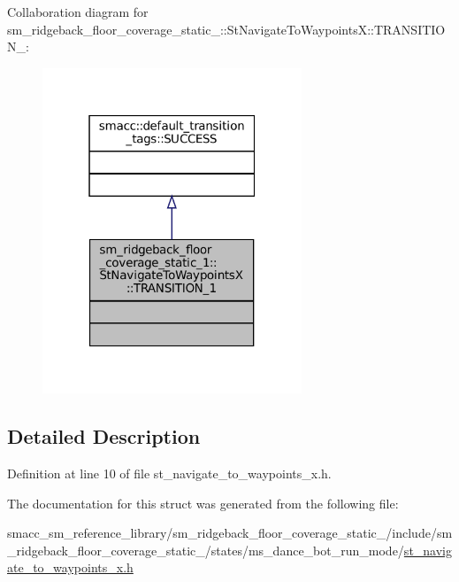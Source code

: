 Collaboration diagram for sm\+\_\+ridgeback\+\_\+floor\+\_\+coverage\+\_\+static\+\_\+:\+:St\+Navigate\+To\+WaypointsX\+:\+:T\+R\+A\+N\+S\+I\+T\+I\+O\+N\+\_\+:
\nopagebreak
\begin{figure}[H]
\begin{center}
\leavevmode
\includegraphics[width=220pt]{structsm__ridgeback__floor__coverage__static__1_1_1StNavigateToWaypointsX_1_1TRANSITION__1__coll__graph}
\end{center}
\end{figure}


\subsection{Detailed Description}


Definition at line 10 of file st\+\_\+navigate\+\_\+to\+\_\+waypoints\+\_\+x.\+h.



The documentation for this struct was generated from the following file\+:\begin{DoxyCompactItemize}
\item 
smacc\+\_\+sm\+\_\+reference\+\_\+library/sm\+\_\+ridgeback\+\_\+floor\+\_\+coverage\+\_\+static\+\_/include/sm\+\_\+ridgeback\+\_\+floor\+\_\+coverage\+\_\+static\+\_/states/ms\+\_\+dance\+\_\+bot\+\_\+run\+\_\+mode/\hyperlink{sm__ridgeback__floor__coverage__static__1_2include_2sm__ridgeback__floor__coverage__static__1_2s3de40240e877d21ebe8f29fac346ff87}{st\+\_\+navigate\+\_\+to\+\_\+waypoints\+\_\+x.\+h}\end{DoxyCompactItemize}
